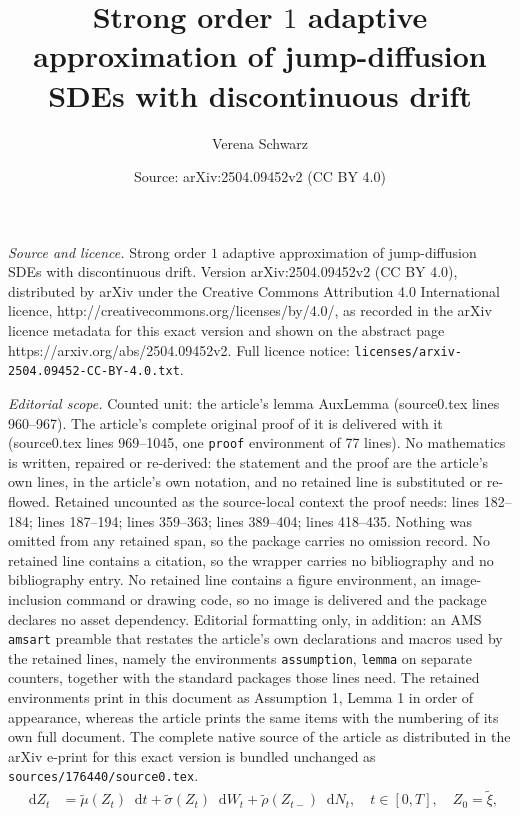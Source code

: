 \documentclass[10pt,a4paper]{amsart}
\title{Strong order $1$ adaptive approximation of jump-diffusion SDEs with discontinuous drift}
\author{Verena Schwarz}
\date{Source: arXiv:2504.09452v2 (CC BY 4.0)}
\newcommand{\diff}{\mathop{}\!\mathrm{d}}
\begin{document}
\maketitle

\noindent\emph{Source and licence.} Strong order $1$ adaptive approximation of jump-diffusion SDEs with discontinuous drift. Version arXiv:2504.09452v2 (CC BY 4.0), distributed by arXiv under the Creative Commons Attribution 4.0 International licence, http://creativecommons.org/licenses/by/4.0/, as recorded in the arXiv licence metadata for this exact version and shown on the abstract page https://arxiv.org/abs/2504.09452v2. Full licence notice: \texttt{licenses/arxiv-2504.09452-CC-BY-4.0.txt}.\par\smallskip

\noindent\textit{Editorial scope.} Counted unit: the article's lemma AuxLemma (source0.tex lines 960--967). The article's complete original proof of it is delivered with it (source0.tex lines 969--1045, one \texttt{proof} environment of 77 lines). No mathematics is written, repaired or re-derived: the statement and the proof are the article's own lines, in the article's own notation, and no retained line is substituted or re-flowed.  Retained uncounted as the source-local context the proof needs: lines 182--184; lines 187--194; lines 359--363; lines 389--404; lines 418--435.  Nothing was omitted from any retained span, so the package carries no omission record.  No retained line contains a citation, so the wrapper carries no bibliography and no bibliography entry.  No retained line contains a figure environment, an image-inclusion command or drawing code, so no image is delivered and the package declares no asset dependency.  Editorial formatting only, in addition: an AMS \texttt{amsart} preamble that restates the article's own declarations and macros used by the retained lines, namely the environments \texttt{assumption}, \texttt{lemma} on separate counters, together with the standard packages those lines need.  The retained environments print in this document as Assumption 1, Lemma 1 in order of appearance, whereas the article prints the same items with the numbering of its own full document.  The complete native source of the article as distributed in the arXiv e-print for this exact version is bundled unchanged as \texttt{sources/176440/source0.tex}.
\begin{align}\label{eq:TSDE}
\diff Z_t &=\widetilde \mu(Z_t)  \diff t + \widetilde \sigma(Z_t) \diff W_t+\widetilde \rho(Z_{t-})\diff N_t , \quad t\in[0,T], \quad Z_0=\widetilde \xi,
\end{align}
\end{document}
